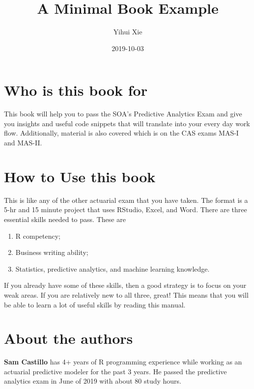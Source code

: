 \documentclass[]{book}
\title{A Minimal Book Example}
\author{Yihui Xie}
\date{2019-10-03}
\providecommand{\tightlist}{%
  \setlength{\itemsep}{0pt}\setlength{\parskip}{0pt}}
\begin{document}
\maketitle

{
\setcounter{tocdepth}{1}
\tableofcontents
}
\hypertarget{who-is-this-book-for}{%
\chapter{Who is this book for}\label{who-is-this-book-for}}

This book will help you to pass the SOA's Predictive Analytics Exam and give you insights and useful code snippets that will translate into your every day work flow. Additionally, material is also covered which is on the CAS exams MAS-I and MAS-II.

\hypertarget{how-to-use-this-book}{%
\chapter{How to Use this book}\label{how-to-use-this-book}}

This is like any of the other actuarial exam that you have taken. The format is a 5-hr and 15 minute project that uses RStudio, Excel, and Word. There are three essential skills needed to pass. These are

\begin{enumerate}
\def\labelenumi{\arabic{enumi}.}
\tightlist
\item
  R competency;
\item
  Business writing ability;
\item
  Statistics, predictive analytics, and machine learning knowledge.
\end{enumerate}

If you already have some of these skills, then a good strategy is to focus on your weak areas. If you are relatively new to all three, great! This means that you will be able to learn a lot of useful skills by reading this manual.

\hypertarget{about-the-authors}{%
\chapter{About the authors}\label{about-the-authors}}

\textbf{Sam Castillo} has 4+ years of R programming experience while working as an actuarial predictive modeler for the past 3 years. He passed the predictive analytics exam in June of 2019 with about 80 study hours.
\end{document}
